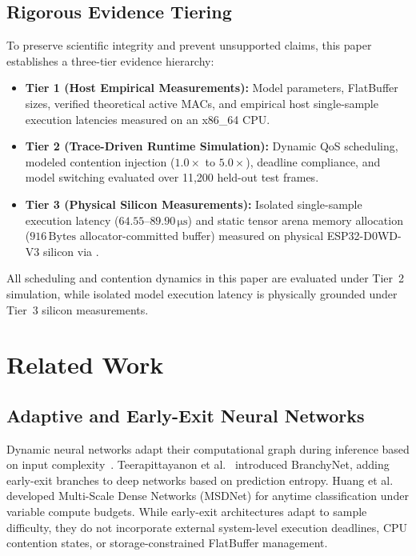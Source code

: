 \documentclass[journal]{IEEEtran}
\begin{document}
\subsection{Rigorous Evidence Tiering}
To preserve scientific integrity and prevent unsupported claims, this paper establishes a three-tier evidence hierarchy:
\begin{itemize}
    \item \textbf{Tier 1 (Host Empirical Measurements):} Model parameters, FlatBuffer sizes, verified theoretical active MACs, and empirical host single-sample execution latencies measured on an x86\_64 CPU.
    \item \textbf{Tier 2 (Trace-Driven Runtime Simulation):} Dynamic QoS scheduling, modeled contention injection ($1.0\times$ to $5.0\times$), deadline compliance, and model switching evaluated over 11,200 held-out test frames.
    \item \textbf{Tier 3 (Physical Silicon Measurements):} Isolated single-sample execution latency ($64.55\text{--}89.90\,\si{\micro\second}$) and static tensor arena memory allocation ($916\,\text{Bytes}$ allocator-committed buffer) measured on physical ESP32-D0WD-V3 silicon via .
\end{itemize}
All scheduling and contention dynamics in this paper are evaluated under Tier~2 simulation, while isolated model execution latency is physically grounded under Tier~3 silicon measurements.

\section{Related Work}
\subsection{Adaptive and Early-Exit Neural Networks}
Dynamic neural networks adapt their computational graph during inference based on input complexity~\cite{matsubara2022split,han2021dynamic}. Teerapittayanon et al.~\cite{teerapittayanon2016branchynet} introduced BranchyNet, adding early-exit branches to deep networks based on prediction entropy. Huang et al.~\cite{huang2018multi} developed Multi-Scale Dense Networks (MSDNet) for anytime classification under variable compute budgets. While early-exit architectures adapt to sample difficulty, they do not incorporate external system-level execution deadlines, CPU contention states, or storage-constrained FlatBuffer management.
\end{document}
